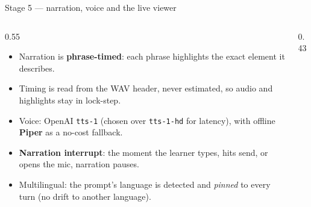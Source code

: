 \documentclass[aspectratio=169,11pt]{beamer}
\begin{document}
\begin{frame}{Stage 5 --- narration, voice and the live viewer}
  \begin{columns}[T]
  \begin{column}{0.55\textwidth}
  \begin{itemize}\footnotesize
    \item Narration is \textbf{phrase-timed}: each phrase highlights the
          exact element it describes.
    \item Timing is read from the WAV header, never estimated, so audio and
          highlights stay in lock-step.
    \item Voice: OpenAI \texttt{tts-1} (chosen over \texttt{tts-1-hd} for
          latency), with offline \textbf{Piper} as a no-cost fallback.
    \item \textbf{Narration interrupt}: the moment the learner types, hits
          send, or opens the mic, narration pauses.
    \item Multilingual: the prompt's language is detected and \emph{pinned}
          to every turn (no drift to another language).
  \end{itemize}
  \end{column}
  \begin{column}{0.43\textwidth}
    \centering
  \end{column}
  \end{columns}
\end{frame}
\end{document}

